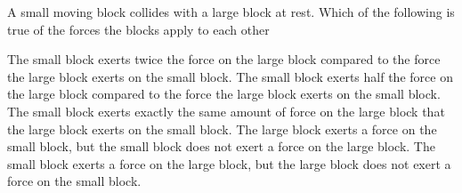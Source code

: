 \documentclass{../../../oss-ap12ibhl-print}
\begin{document}
\genheader


\begin{questions}
  \question A small moving block collides with a large block at rest. Which of
  the following is true of the forces the blocks apply to each other
  \begin{choices}
    \choice The small block exerts twice the force on the large block
    compared to the force the large block exerts on the small block.
    \choice The small block exerts half the force on the large block compared
    to the force the large block exerts on the small block.
    \choice The small block exerts exactly the same amount of force on the
    large block that the large block exerts on the small block.
    \choice The large block exerts a force on the small block, but the small
    block does not exert a force on the large block.
    \choice The small block exerts a force on the large block, but the large
    block does not exert a force on the small block.
  \end{choices}
  

%
%  
%  

\end{questions}
\end{document}
